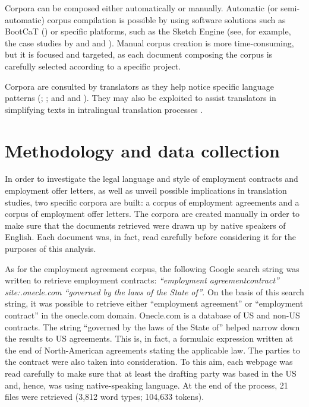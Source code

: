 \documentclass[output=paper]{langscibook}
\begin{document}
Corpora can be composed either automatically or manually. Automatic (or semi-automatic) corpus compilation is possible by using software solutions such as BootCaT (\citealt{BaroniBernardini2004}) or specific platforms, such as the Sketch Engine \citep{KilgarriffEtAl2004} (see, for example, the case studies by \citealt{Resi2024} and \citealt{Giampieri2024} and \citeyear{Giampieri2025}). Manual corpus creation is more time-consuming, but it is focused and targeted, as each document composing the corpus is carefully selected according to a specific project.

Corpora are consulted by translators as they help notice specific  language patterns (\citealt{Zanettin2002};    \citealt{VigierMorenoSánchezRamos2017}; \citealt{Giampieri2024} and and \citeyear{Giampieri2025}). They may also be exploited to assist translators in simplifying texts in intralingual translation processes \citep{StoddenEtAl2023}.

\section{Methodology and data collection}\label{sec:giampieri:3}

In order to investigate the legal language and style of employment contracts and employment offer letters, as well as unveil possible implications in translation studies, two specific corpora are built: a corpus of employment agreements and a corpus of employment offer letters. The corpora are created manually in order to make sure that the documents retrieved were drawn up by native speakers of English. Each document was, in fact, read carefully before considering it for the purposes of this analysis.

As for the employment agreement corpus, the following Google search string was written to retrieve employment contracts: \textit{“employment agreement{\textbar}contract” site:.onecle.com “governed by the laws of the State of”}. On the basis of this search string, it was possible to retrieve either “employment agreement” or “employment contract” in the onecle.com domain. Onecle.com is a database of US and non-US contracts. The string “governed by the laws of the State of” helped narrow down the results to US agreements. This is, in fact, a formulaic expression written at the end of North-American agreements stating the applicable law. The parties to the contract were also taken into consideration. To this aim, each webpage was read carefully to make sure that at least the drafting party was based in the US and, hence, was using native-speaking language. At the end of the process, 21 files were retrieved (3,812 word types; 104,633 tokens).
\end{document}
